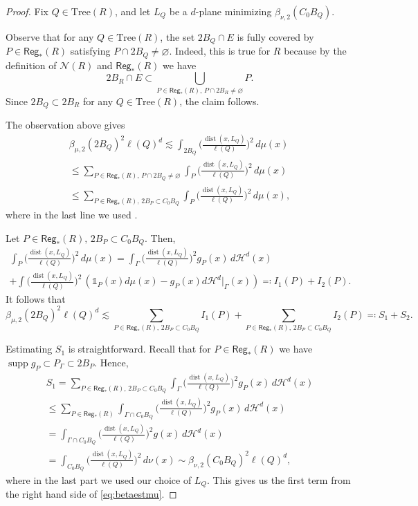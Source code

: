 \documentclass[11pt,reqno]{amsart}
\newcommand{\Tr}{\mathrm{Tree}}
\def\one{\mathds{1}}
\def\dist{\mathop\mathrm{dist}} 						%
\newcommand{\fr}[2]{\frac{#1}{#2}}
\theoremstyle{definition}
\theoremstyle{remark}
\numberwithin{equation}{section}
\newcommand{\nbd}{\mathcal{N}}
\newcommand{\hd}{\mathcal{H}^d}
\newcommand{\Reg}{\mathsf{Reg}_*}
\DeclareMathOperator{\supp}{supp}
\theoremstyle{theorem}
\theoremstyle{definition}
\theoremstyle{remark}
\numberwithin{equation}{section}
\begin{document}
	\begin{proof}
		Fix $Q\in\Tr(R)$, and let $L_Q$ be a $d$-plane minimizing $\beta_{\nu,2}(C_0B_Q)$.
		
		Observe that for any $Q\in \Tr(R)$, the set $2B_Q\cap E$ is fully covered by $P\in\Reg(R)$ satisfying $P\cap 2B_Q\neq\varnothing$. Indeed, this is true for $R$ because by the definition of $\nbd(R)$ and $\Reg(R)$ we have 
		\begin{equation*}
		2B_R\cap E\subset \bigcup_{P\in\Reg(R),\, P\cap 2B_R\neq\varnothing}P.
		\end{equation*}
		Since $2B_Q\subset 2B_R$ for any $Q\in\Tr(R)$, the claim follows.
		
		The observation above gives
		\begin{multline*}
		\beta_{\mu,2}(2B_Q)^2\ell(Q)^d \lesssim \int_{2B_Q}\bigg(\fr{\dist(x,L_Q)}{\ell(Q)}\bigg)^2\, d\mu(x)\\
		\le\sum_{P\in\Reg(R),\, P\cap 2B_Q\neq\varnothing} \int_{P}\bigg(\fr{\dist(x,L_Q)}{\ell(Q)}\bigg)^2\, d\mu(x)\\
		\le \sum_{P\in\Reg(R),\, 2B_P\subset C_0B_Q} \int_{P}\bigg(\fr{\dist(x,L_Q)}{\ell(Q)}\bigg)^2\, d\mu(x),
		\end{multline*}
		where in the last line we used .
		
		Let $P\in\Reg(R),\, 2B_P\subset C_0B_Q$. Then,
		\begin{multline*}
		\int_{P}\bigg(\fr{\dist(x,L_Q)}{\ell(Q)}\bigg)^2\, d\mu(x)
		 = \int_{\Gamma}\bigg(\fr{\dist(x,L_Q)}{\ell(Q)}\bigg)^2g_P(x)\, d\hd(x)\\
		  + \int \bigg(\fr{\dist(x,L_Q)}{\ell(Q)}\bigg)^2\, (\one_P(x)d\mu(x)-g_P(x)d\hd|_\Gamma(x))
		 \eqqcolon I_1(P)+I_2(P).
		\end{multline*}		
		It follows that
		\begin{equation*}
		\beta_{\mu,2}(2B_Q)^2\ell(Q)^d\lesssim \sum_{P\in\Reg(R),\, 2B_P\subset C_0B_Q}I_1(P) + \sum_{P\in\Reg(R),\, 2B_P\subset C_0B_Q}I_2(P) \eqqcolon S_1+S_2.
		\end{equation*}
		
		Estimating $S_1$ is straightforward. Recall that for $P\in\Reg(R)$ we have $\supp g_P\subset P_\Gamma\subset 2B_P$. Hence,
		\begin{multline*}
		S_1 = \sum_{P\in\Reg(R),\, 2B_P\subset C_0B_Q}\int_{\Gamma}\bigg(\fr{\dist(x,L_Q)}{\ell(Q)}\bigg)^2g_P(x)\, d\hd(x)\\
		 \le\sum_{P\in\Reg(R)}\int_{\Gamma\cap C_0B_Q}\bigg(\fr{\dist(x,L_Q)}{\ell(Q)}\bigg)^2g_P(x)\, d\hd(x)\\
		  = \int_{\Gamma\cap C_0B_Q}\bigg(\fr{\dist(x,L_Q)}{\ell(Q)}\bigg)^2g(x)\, d\hd(x)\\
		 = \int_{C_0B_Q}\bigg(\fr{\dist(x,L_Q)}{\ell(Q)}\bigg)^2\, d\nu(x)\sim\beta_{\nu,2}(C_0B_Q)^2\ell(Q)^d,
		\end{multline*}
		where in the last part we used our choice of $L_Q$. This gives us the first term from the right hand side of \eqref{eq:betaestmu}.
		

\end{proof}
\end{document}
